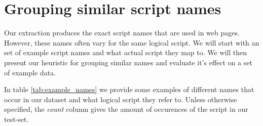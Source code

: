 \documentclass[11pt,a4paper,oneside]{scrartcl}
\begin{document}
\section{Grouping similar script names}
Our extraction produces the exact script names that are used in web pages. However, these names often vary for the same logical script. We will start with an set of example script names and what actual script they map to. We will then present our heuristic for grouping similar names and evaluate it's effect on a set of example data.

In table \ref{tab:example_names} we provide some examples of different names that occur in our dataset and what logical script they refer to. Unless otherwise specified, the \emph{count} column gives the amount of occurences of the script in our test-set.
\end{document}

